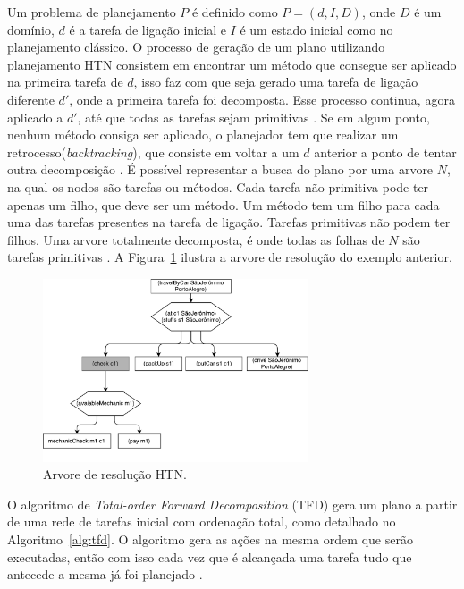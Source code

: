 Um problema de planejamento $P$ é definido como $P = (d, I, D)$, onde $D$ é um domínio, $d$ é a tarefa de ligação inicial e $I$ é um estado inicial como no planejamento clássico. 
O processo de geração de um plano utilizando planejamento HTN consistem em encontrar um método que consegue ser aplicado na primeira tarefa de $d$, isso faz com que seja gerado uma tarefa de ligação diferente $d'$, onde a primeira tarefa foi decomposta. 
Esse processo continua, agora aplicado a $d'$, até que todas as tarefas sejam primitivas \cite{meneguzzi2015planning}. 
Se em algum ponto, nenhum método consiga ser aplicado, o planejador tem que realizar um retrocesso(\textit{backtracking}), que consiste em voltar a um $d$ anterior a ponto de tentar outra decomposição \cite{intelligence2003modern}. 
É possível representar a busca do plano por uma arvore $N$, na qual os nodos são tarefas ou métodos. 
Cada tarefa não-primitiva pode ter apenas um filho, que deve ser um método. 
Um método tem um filho para cada uma das tarefas presentes na tarefa de ligação. 
Tarefas primitivas não podem ter filhos. 
Uma arvore totalmente decomposta, é onde todas as folhas de $N$ são tarefas primitivas \cite{ontanon2015adversarial}. 
A Figura~\ref{fig:htnmethodtree} ilustra a arvore de resolução do exemplo anterior.

\begin{figure}[ht]
	\centering
	\includegraphics[width=0.7\textwidth]{fig/htnmethodresult.pdf}
	\caption{Arvore de resolução HTN.}
	\label{fig:htnmethodtree}
\end{figure}

O algoritmo de \textit{Total-order Forward Decomposition} (TFD) gera um plano a partir de uma rede de tarefas inicial com ordenação total, como detalhado no  Algoritmo~\ref{alg:tfd}. 
O algoritmo gera as ações na mesma ordem que serão executadas, então com isso cada vez que é alcançada uma tarefa tudo que antecede a mesma já foi planejado \cite{ghallab2004automated}.
 
